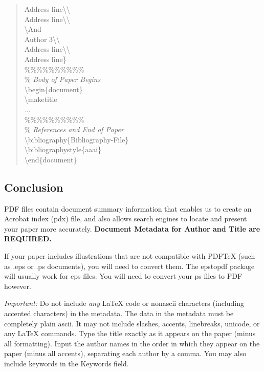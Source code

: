 \documentclass[letterpaper]{article}
\begin{document}
\begin{quote}
\begin{small}
			Address line\textbackslash\textbackslash\\ Address line\textbackslash\textbackslash \\
			\textbackslash And\\
			Author 3\textbackslash\textbackslash\\ Address line\textbackslash\textbackslash\\ Address line\}\\
			\%\%\%\%\%\%\%\%\%\%\\
			\% \textit{Body of Paper Begins}\\
			\textbackslash begin\{document\}\\
			\textbackslash maketitle\\
			...\\
			\%\%\%\%\%\%\%\%\%\%\\
			\% \textit{References and End of Paper}\\
			\textbackslash bibliography\{Bibliography-File\}\\
			\textbackslash bibliographystyle\{aaai\}\\
			\textbackslash end\{document\}
		\end{small}
	\end{quote}
	
	\subsection{Conclusion}
	PDF files contain document summary information that enables us to create an Acrobat index (pdx) file, and also allows search engines to locate and present your paper more accurately. \textbf{Document Metadata  for Author and Title are REQUIRED.} 
	
	If your paper includes illustrations that are not compatible with PDF\TeX{} (such as .eps or .ps documents), you will need to convert them. The epstopdf package will usually work for eps files. You will need to convert your ps files to PDF however.
	
	\textit{Important:} Do not include \textit{any} \LaTeX{} code or nonascii characters (including accented characters) in the metadata. The data in the metadata must be completely plain ascii. It may not include slashes, accents, linebreaks, unicode, or any \LaTeX{} commands. Type the title exactly as it appears on the paper (minus all formatting). Input the author names in the order in which they appear on the paper (minus all accents), separating each author by a comma. You may also include keywords in the Keywords field.
	
\end{document}
